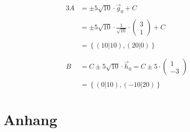 \documentclass[12pt,a4paper]{scrbook}
\begin{document}
\begin{alignat}{3}
A & = \pm 5 \sqrt{10} \cdot \vec{g}_0 + C \nonumber\\ \nonumber\\
  & = \pm 5 \sqrt{10} \cdot \frac{1}{\sqrt{10}} \cdot \left(\begin{array}{c}3\\1\end{array}\right) + C \nonumber \\ \nonumber\\
  & = \left\{(10 \vert 10), (20 \vert 0) \right\} \nonumber \nonumber\\ \nonumber\\ \nonumber\\
B & = C \pm 5 \sqrt{10} \cdot \vec{h}_0 = C \pm 5 \cdot \left(\begin{array}{c}1\\-3\end{array}\right) \nonumber\\ \nonumber\\
  & = \left\{ (0 \vert 10), (-10 \vert 20) \right\} \nonumber
\end{alignat}


\part{Anhang}
\listoffigures
\end{document}
